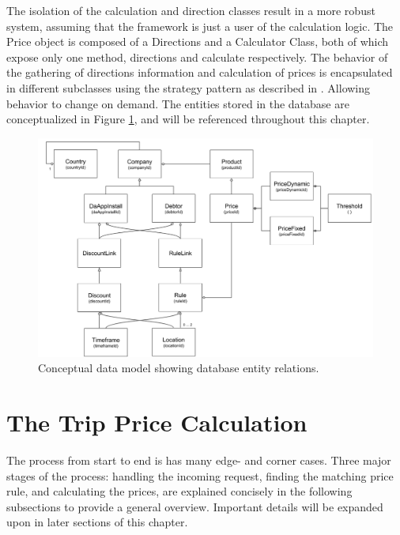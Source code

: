 The isolation of the calculation and direction classes result in a more robust system, assuming that the framework is just a user of the calculation logic. The Price object is composed of a Directions and a Calculator Class, both of which expose only one method, directions and calculate respectively. The behavior of the gathering of directions information and calculation of prices is encapsulated in different subclasses using the strategy pattern as described in \cite{gof}. Allowing behavior to change on demand. The entities stored in the database are conceptualized in Figure \ref{fig:Data Model}, and will be referenced throughout this chapter.

\begin{figure}[H]
	\centering
	\includegraphics[width=1\textwidth]{DataModel}
	\caption[Data Model]{Conceptual data model showing database entity relations.}
	\label{fig:Data Model}
\end{figure}

\section{The Trip Price Calculation}
The process from start to end is has many edge- and corner cases. Three major stages of the process: handling the incoming request, finding the matching price rule, and calculating the prices, are explained concisely in the following subsections to provide a general overview. Important details will be expanded upon in later sections of this chapter.


